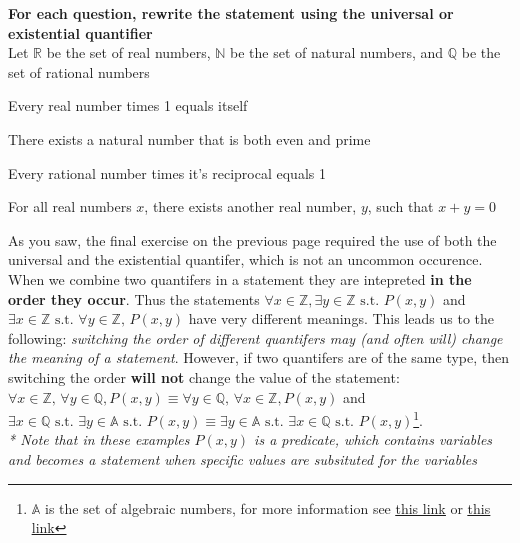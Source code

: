 \documentclass[addpoints]{exam}
\newcommand{\st}{\text{ s.t. }}
\begin{document}
\textbf{For each question, rewrite the statement using the universal or existential quantifier} \\ 
Let $\mathbb{R}$ be the set of real numbers, $\mathbb{N}$ be the set of natural numbers, and $\mathbb{Q}$ be the set of rational numbers

\begin{questions}
  \begin{minipage}{0.45\linewidth}
    \question Every real number times 1 equals itself
  \end{minipage}
  \hfill 
  \begin{minipage}{0.45\linewidth}
    \question There exists a natural number that is both even and prime
  \end{minipage} 

  \begin{minipage}{0.45\linewidth}
    \question Every rational number times it's reciprocal equals 1
  \end{minipage}
  \hfill 
  \begin{minipage}{0.45\linewidth}
    \question For all real numbers $x$, there exists another real number, $y$, such that $x+y=0$
  \end{minipage}
\end{questions}

\newpage 

\begin{tcolorbox}[title=COMBINING QUANTIFERS,colframe=black,sharp corners,colback=white,colbacktitle=white,coltitle=black]
  As you saw, the final exercise on the previous page required the use of both the universal and the existential quantifer, which is not an uncommon occurence. When we combine two quantifers in a statement they are intepreted \textbf{in the order they occur}. Thus the statements $\forall x \in \mathbb{Z}, \exists y \in \mathbb{Z} \text{ s.t. } P(x, y) $ and $\exists x \in \mathbb{Z} \text{ s.t. } \forall y \in \mathbb{Z}\text{, } P(x, y) $ have very different meanings. This leads us to the following: \textit{switching the order of different quantifers may (and often will) change the meaning of a statement}. However, if two quantifers are of the same type, then switching the order \textbf{will not} change the value of the statement: $\forall x \in \mathbb{Z}\text{, } \forall y \in \mathbb{Q}, P(x, y) \equiv \forall y \in \mathbb{Q}\text{, } \forall x \in \mathbb{Z}, P(x, y)$ and $\exists x \in \mathbb{Q} \text{ s.t. } \exists y \in \mathbb{A} \text{ s.t. } P(x, y) \equiv \exists y \in \mathbb{A} \text{ s.t. } \exists x \in \mathbb{Q} \st P(x, y)$\footnote{$\mathbb{A}$ is the set of algebraic numbers, for more information see \href{https://en.wikipedia.org/wiki/Algebraic_number}{\underline{this link}} or \href{https://www.mathsisfun.com/numbers/algebraic-numbers.html}{\underline{this link}}}. \\ 
  \small \textit{* Note that in these examples $P(x, y)$ is a predicate, which contains variables and becomes a statement when specific values are subsituted for the variables}
\end{tcolorbox}
\end{document}
